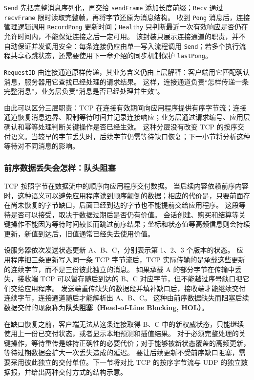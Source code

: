 \texttt{Send} 先把完整消息序列化，再交给 \texttt{sendFrame} 添加长度前缀；\texttt{Recv} 通过 \texttt{recvFrame} 限时读取完整帧，再将字节还原为消息结构。
收到 \texttt{Pong} 消息后，连接管理逻辑调用 \texttt{RecordPong} 更新时间；\texttt{Healthy} 只判断最近一次有效响应是否仍在允许时间内，不能保证连接之后一定可用。
该封装只展示连接通道的职责，并不自动保证并发调用安全：每条连接仍应由单一写入流程调用 \texttt{Send}；若多个执行流程共享心跳状态，还需要使用下一章介绍的同步机制保护 \texttt{lastPong}。

\texttt{RequestID} 由连接通道原样传递，其业务含义仍由上层解释：客户端用它匹配确认消息，服务器用它查找已经处理的请求结果。
这样，连接通道负责“怎样传递一条完整消息”，业务层负责“消息是否已经处理并生效”。

由此可以区分三层职责：TCP 在连接有效期间向应用程序提供有序字节流；连接通道恢复消息边界、限制等待时间并记录连接响应；业务层通过请求编号、应用层确认和幂等处理判断关键操作是否已经生效。
这种分层没有改变 TCP 的按序交付语义。当较早的字节丢失时，后续字节仍需等待缺口恢复；下一小节将分析这种等待对不同消息的影响。

\subsubsection{前序数据丢失会怎样：队头阻塞}

TCP 按照字节在数据流中的顺序向应用程序交付数据。
当后续内容依赖前序内容时，这种语义可以避免应用程序读到顺序颠倒的数据；相应的代价是，只要前面存在尚未恢复的字节缺口，后面已经到达的字节也不能提前交给应用程序。
这段等待是否可以接受，取决于数据过期后是否仍有价值。
会话创建、购买和结算等关键操作不能因为等待时间较长而跳过前序结果；坐标和状态值等高频信息则会持续更新，新值到达后，旧值通常已经失去使用价值。

设服务器依次发送状态更新 A、B、C，分别表示第 1、2、3 个版本的状态。
应用程序把三条更新写入同一条 TCP 字节流后，TCP 实际传输的是承载这些更新的连续字节，而不是三份彼此独立的消息。
如果承载 A 的部分字节在传输中丢失，接收端 TCP 可以暂存随后到达的 B、C 对应字节，但不能越过序号缺口把它们交给应用程序。
发送端重传缺失的数据段并填补缺口后，接收端才能继续交付连续字节，连接通道随后才能解析出 A、B、C。
这种由前序数据缺失而阻塞后续数据交付的现象称为\textbf{队头阻塞（Head-of-Line Blocking, HOL）}。

在缺口恢复之前，客户端无法从这条连接取得 B、C 中的新权威状态，只能继续使用上一份已交付状态，或者显示本地预测和插值结果。
对于必须完整处理的关键操作，等待重传是维持正确性的必要代价；对于能够被新状态覆盖的高频更新，等待过期数据会扩大一次丢失造成的延迟。
要让后续更新不受前序缺口阻塞，需要采用彼此独立的交付单位。下一节将对比 TCP 的按序字节流与 UDP 的独立数据报，并给出两种交付方式的结构示意。

